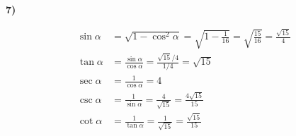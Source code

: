 \documentclass[11pt,a4paper,fleqn]{article}
\begin{document}
\textbf{7)}

\begin{align*}
  \sin\alpha
    &= \sqrt{1 - \cos^{2}\alpha}
     = \sqrt{1 - \frac{1}{16}}
     = \sqrt{\frac{15}{16}}
     = \frac{\sqrt{15}}{4} \\[6pt]
  \tan\alpha
    &= \frac{\sin\alpha}{\cos\alpha}
     = \frac{\sqrt{15}/4}{1/4}
     = \sqrt{15} \\[6pt]
  \sec\alpha
    &= \frac{1}{\cos\alpha} = 4 \\[6pt]
  \csc\alpha
    &= \frac{1}{\sin\alpha}
     = \frac{4}{\sqrt{15}}
     = \frac{4\sqrt{15}}{15} \\[6pt]
  \cot\alpha
    &= \frac{1}{\tan\alpha}
     = \frac{1}{\sqrt{15}}
     = \frac{\sqrt{15}}{15}
\end{align*}
\end{document}

